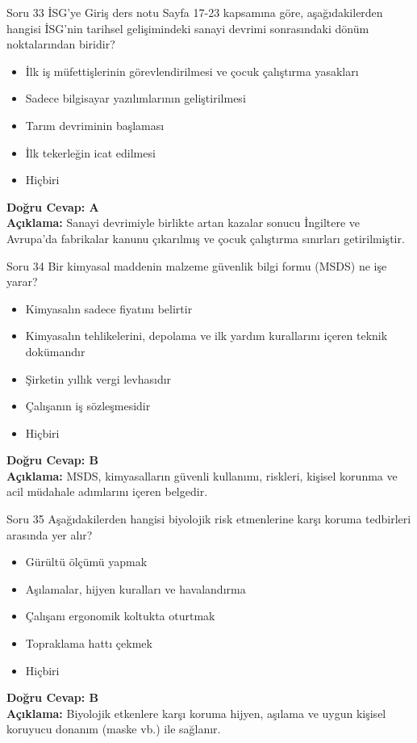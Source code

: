 \documentclass[12pt,a4paper]{article}
\begin{document}
\begin{testcard}{Soru 33}
    İSG'ye Giriş ders notu Sayfa 17-23 kapsamına göre, aşağıdakilerden hangisi İSG'nin tarihsel gelişimindeki sanayi devrimi sonrasındaki dönüm noktalarından biridir?
    \begin{itemize}
        \item[A)] İlk iş müfettişlerinin görevlendirilmesi ve çocuk çalıştırma yasakları
        \item[B)] Sadece bilgisayar yazılımlarının geliştirilmesi
        \item[C)] Tarım devriminin başlaması
        \item[D)] İlk tekerleğin icat edilmesi
        \item[E)] Hiçbiri
    \end{itemize}
    \tcblower
    \textbf{Doğru Cevap: A} \\
    \textbf{Açıklama:} Sanayi devrimiyle birlikte artan kazalar sonucu İngiltere ve Avrupa'da fabrikalar kanunu çıkarılmış ve çocuk çalıştırma sınırları getirilmiştir.
\end{testcard}

\begin{testcard}{Soru 34}
    Bir kimyasal maddenin malzeme güvenlik bilgi formu (MSDS) ne işe yarar?
    \begin{itemize}
        \item[A)] Kimyasalın sadece fiyatını belirtir
        \item[B)] Kimyasalın tehlikelerini, depolama ve ilk yardım kurallarını içeren teknik dokümandır
        \item[C)] Şirketin yıllık vergi levhasıdır
        \item[D)] Çalışanın iş sözleşmesidir
        \item[E)] Hiçbiri
    \end{itemize}
    \tcblower
    \textbf{Doğru Cevap: B} \\
    \textbf{Açıklama:} MSDS, kimyasalların güvenli kullanımı, riskleri, kişisel korunma ve acil müdahale adımlarını içeren belgedir.
\end{testcard}

\begin{testcard}{Soru 35}
    Aşağıdakilerden hangisi biyolojik risk etmenlerine karşı koruma tedbirleri arasında yer alır?
    \begin{itemize}
        \item[A)] Gürültü ölçümü yapmak
        \item[B)] Aşılamalar, hijyen kuralları ve havalandırma
        \item[C)] Çalışanı ergonomik koltukta oturtmak
        \item[D)] Topraklama hattı çekmek
        \item[E)] Hiçbiri
    \end{itemize}
    \tcblower
    \textbf{Doğru Cevap: B} \\
    \textbf{Açıklama:} Biyolojik etkenlere karşı koruma hijyen, aşılama ve uygun kişisel koruyucu donanım (maske vb.) ile sağlanır.
\end{testcard}
\end{document}
